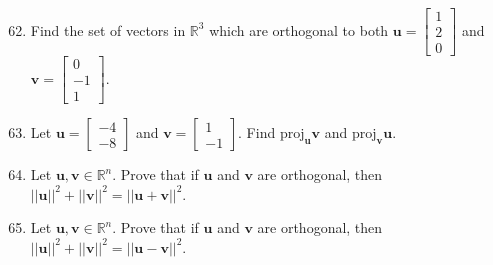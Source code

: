 \documentclass{article}
\begin{document}
\begin{enumerate}
    \setcounter{enumi}{61}
    \item Find the set of vectors in \(\mathbb{R}^3\) which are orthogonal to both \(\mathbf{u} = \begin{bmatrix}
        1\\2\\0
    \end{bmatrix}\) and \(\mathbf{v} = \begin{bmatrix}
        0\\-1\\1
    \end{bmatrix}\).
    \item Let \(\mathbf{u} = \begin{bmatrix}
        -4\\-8
    \end{bmatrix}\) and \(\mathbf{v} = \begin{bmatrix}
        1\\-1
    \end{bmatrix}\). Find \(\text{proj}_\mathbf{u} \mathbf{v}\) and \(\text{proj}_\mathbf{v} \mathbf{u}\).
    \item Let \(\mathbf{u}, \mathbf{v} \in \mathbb{R}^n\). Prove that if \(\mathbf{u} \) and \(\mathbf{v} \) are orthogonal, then \({|\!| \mathbf{u}|\!|}^2 + {|\!| \mathbf{v}|\!|}^2 = {|\!| \mathbf{u} + \mathbf{v}|\!|}^2\).
    \item Let \(\mathbf{u}, \mathbf{v} \in \mathbb{R}^n\). Prove that if \(\mathbf{u} \) and \(\mathbf{v} \) are orthogonal, then \({|\!| \mathbf{u}|\!|}^2 + {|\!| \mathbf{v}|\!|}^2 = {|\!| \mathbf{u} - \mathbf{v}|\!|}^2\).
\end{enumerate}
\pagebreak 
\end{document}
